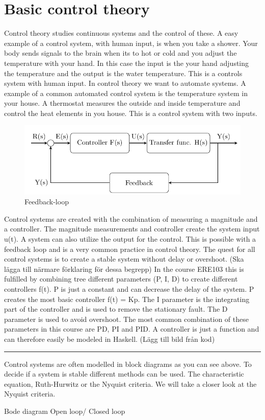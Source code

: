 \section{Basic control theory}


Control theory studies continuous systems and the control of these. A easy example of a control system, with human input, is when you take a shower. Your body sends signals to the brain when its to hot or cold and you adjust the temperature with your hand. In this case the input is the your hand adjusting the temperature and the output is the water temperature. This is a controls system with human input. In control theory we want to automate systems. A example of a common automated control system is the temperature system in your house. A thermostat measures the outside and inside temperature and control the heat elements in you house. This is a control system with two inputs.

\begin{figure}[H]
    \centering
    \includegraphics[]{feedback.PNG}
    \caption{Feedback-loop}
    \label{fig:feed}
\end{figure}


Control systems are created with the combination of measuring a magnitude and a controller. The magnitude measurements and controller create the system input u(t). A system can also utilize the output for the control. This is possible with a feedback loop and is a very common practice in control theory. The quest for all control systems is to create a stable system without delay or overshoot. (Ska lägga till närmare förklaring för dessa begrepp) In the course ERE103 this is fulfilled by combining tree different parameters (P, I, D) to create different controllers f(t).  P is just a constant and can decrease the delay of the system. P creates the most basic controller f(t) = Kp. The I parameter is the integrating part of the controller and is used to remove the stationary fault. The D parameter is used to avoid overshoot. The most common combination of these parameters in this course are PD, PI and PID. A controller is just a function and can therefore easily be modeled in Haskell.
(Lägg till bild från kod)
\hrule
Control systems are often modelled in block diagrams as you can see above.
To decide if a system is stable different methods can be used. The characteristic equation, Ruth-Hurwitz or the Nyquist criteria. We will take a closer look at the Nyquist criteria. 

Bode diagram
Open loop/ Closed loop





